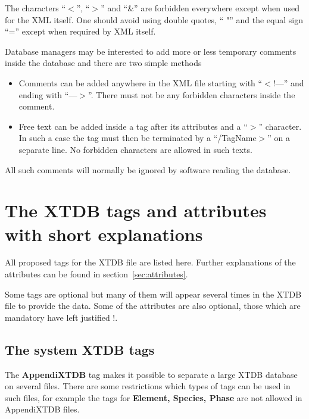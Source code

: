 \documentclass{article}
\begin{document}
The characters ``$<$'', ``$>$''  and ``\&'' are forbidden everywhere
except when used for the XML itself.  One should avoid using double
quotes, `` "'' and the equal sign ``='' except when required by XML
itself.

Database managers may be interested to add more or less temporary
comments inside the database and there are two simple methods
\begin{itemize}
\item Comments can be added anywhere in the XML file starting with
``$<$!---'' and ending with ``---$>$''.  There must not be any
forbidden characters inside the comment.

\item Free text can be added inside a tag after its attributes and a ``$>$''
character.  In such a case the tag must then be terminated by a
``/TagName$>$'' on a separate line.  No forbidden characters are
allowed in such texts.
\end{itemize}
All such comments will normally be ignored by software reading the
database.


\newpage

\section{The XTDB tags and attributes with short explanations}\label{sec:tags}

All proposed tags for the XTDB file are listed here. Further explanations
of the attributes can be found in section~\ref{sec:attributes}.

Some tags are optional but many of them will appear several times in
the XTDB file to provide the data.  Some of the attributes are also
optional, those which are mandatory have left justified !.

\subsection{The system XTDB tags}\label{sec:first}

The {\bf AppendiXTDB} tag makes it possible to separate a large XTDB
database on several files.  There are some restrictions which types of
tags can be used in such files, for example the tags for {\bf Element,
  Species, Phase} are not allowed in AppendiXTDB files.
\end{document}
